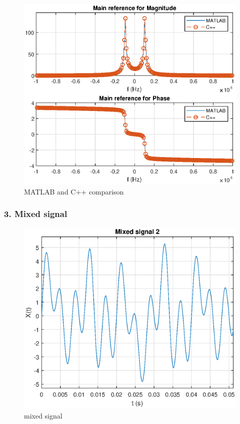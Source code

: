 \begin{figure}[h]
	\centering
	\includegraphics[width=12cm]{./algorithms/fft/figures/Single_sinusoid_fft.eps}
	\caption{MATLAB and C++ comparison}\label{Single_sinusoid_fft}
\end{figure}

\newpage
\subsubsection{3. Mixed signal}

\begin{figure}[h]
	\centering
	\includegraphics[width=12cm]{./algorithms/fft/figures/mixed_signal.eps}
	\caption{mixed signal}\label{mixed_signal}
\end{figure}

